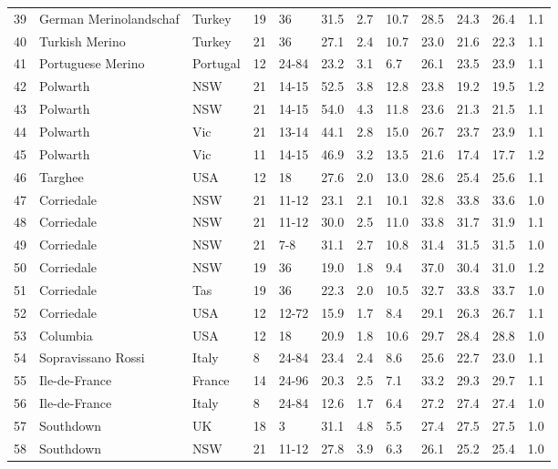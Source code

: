 \begin{center}
\begin{landscape}
\begin{longtable}{|p{0.4in}|p{0.9in}|p{0.7in}|p{0.5in}|p{0.5in}|p{0.5in}|p{0.5in}|p{0.5in}|p{0.5in}|p{0.5in}|p{0.5in}|p{0.5in}|}
 39 &  German Merinolandschaf &  Turkey & 19 &  36 & 31.5 & 2.7 & 10.7 & 28.5 & 24.3 & 26.4 & 1.1 \\ 
 40 &  Turkish Merino &  Turkey & 21 &  36 & 27.1 & 2.4 & 10.7 & 23.0 & 21.6 & 22.3 & 1.1 \\ 
 41 &  Portuguese Merino &  Portugal & 12 &  24-84 & 23.2 & 3.1 & 6.7 & 26.1 & 23.5 & 23.9 & 1.1 \\ 
 42 &  Polwarth &  NSW & 21 &  14-15 & 52.5 & 3.8 & 12.8 & 23.8 & 19.2 & 19.5 & 1.2 \\ 
 43 &  Polwarth &  NSW & 21 &  14-15 & 54.0 & 4.3 & 11.8 & 23.6 & 21.3 & 21.5 & 1.1 \\ 
 44 &  Polwarth &  Vic & 21 &  13-14 & 44.1 & 2.8 & 15.0 & 26.7 & 23.7 & 23.9 & 1.1 \\ 
 45 &  Polwarth &  Vic & 11 &  14-15 & 46.9 & 3.2 & 13.5 & 21.6 & 17.4 & 17.7 & 1.2 \\ 
 46 &  Targhee &  USA & 12 &  18 & 27.6 & 2.0 & 13.0 & 28.6 & 25.4 & 25.6 & 1.1 \\ 
 47 &  Corriedale &  NSW & 21 &  11-12 & 23.1 & 2.1 & 10.1 & 32.8 & 33.8 & 33.6 & 1.0 \\ 
 48 &  Corriedale &  NSW & 21 &  11-12 & 30.0 & 2.5 & 11.0 & 33.8 & 31.7 & 31.9 & 1.1 \\ 
 49 &  Corriedale &  NSW & 21 &  7-8 & 31.1 & 2.7 & 10.8 & 31.4 & 31.5 & 31.5 & 1.0 \\ 
 50 &  Corriedale &  NSW & 19 &  36 & 19.0 & 1.8 & 9.4 & 37.0 & 30.4 & 31.0 & 1.2 \\ 
 51 &  Corriedale &  Tas & 19 &  36 & 22.3 & 2.0 & 10.5 & 32.7 & 33.8 & 33.7 & 1.0 \\ 
 52 &  Corriedale &  USA & 12 &  12-72 & 15.9 & 1.7 & 8.4 & 29.1 & 26.3 & 26.7 & 1.1 \\ 
 53 &  Columbia &  USA & 12 &  18 & 20.9 & 1.8 & 10.6 & 29.7 & 28.4 & 28.8 & 1.0 \\ 
 54 &  Sopravissano Rossi &  Italy &  8 &  24-84 & 23.4 & 2.4 & 8.6 & 25.6 & 22.7 & 23.0 & 1.1 \\ 
 55 &  Ile-de-France &  France & 14 &  24-96 & 20.3 & 2.5 & 7.1 & 33.2 & 29.3 & 29.7 & 1.1 \\ 
 56 &  Ile-de-France &  Italy &  8 &  24-84 & 12.6 & 1.7 & 6.4 & 27.2 & 27.4 & 27.4 & 1.0 \\ 
 57 &  Southdown &  UK & 18 &  3 & 31.1 & 4.8 & 5.5 & 27.4 & 27.5 & 27.5 & 1.0 \\ 
 58 &  Southdown &  NSW & 21 &  11-12 & 27.8 & 3.9 & 6.3 & 26.1 & 25.2 & 25.4 & 1.0 \\ 

\end{longtable}
\end{landscape}
\end{center}
